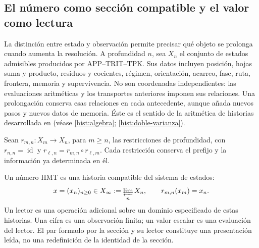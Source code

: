 
\subsection{El número como sección compatible y el valor como lectura}
\label{hist:seccion}

La distinción entre estado y observación permite precisar qué objeto se
prolonga cuando aumenta la resolución. A profundidad \(n\), sea \(X_n\)
el conjunto de estados admisibles producidos por APP--TRIT--TPK. Sus datos
incluyen posición, hojas suma y producto, residuos y cocientes, régimen,
orientación, acarreo, fase, ruta, frontera, memoria y supervivencia. No son
coordenadas independientes: las evaluaciones aritméticas y los transportes
anteriores imponen sus relaciones. Una prolongación conserva esas relaciones
en cada antecedente, aunque añada nuevos pasos y nuevos datos de memoria.
Éste es el sentido de la aritmética de historias desarrollada en
(véase \ref{hist:algebra}; \ref{hist:doble-varianza}).

Sean \(r_{m,n}:X_m\to X_n\), para \(m\geq n\), las restricciones de
profundidad, con \(r_{n,n}=\operatorname{id}\) y
\(r_{\ell,n}=r_{m,n}\circ r_{\ell,m}\). Cada restricción conserva el
prefijo y la información ya determinada en él.

\begin{definition}
Un número HMT es una historia compatible del sistema de estados:
\begin{equation}
 x=(x_n)_{n\geq0}\in X_\infty:=\varprojlim_n X_n,
 \qquad r_{m,n}(x_m)=x_n.
 \label{hist:limite-inverso}
\end{equation}
Un lector es una operación adicional sobre un dominio especificado de estas
historias. Una cifra es una observación finita; un valor escalar es una
evaluación del lector. El par formado por la sección y su lector constituye
una presentación leída, no una redefinición de la identidad de la sección.
\end{definition}

